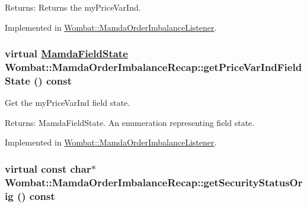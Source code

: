\begin{Desc}
\item[Returns:]Returns the my\-Price\-Var\-Ind. \end{Desc}


Implemented in \hyperlink{classWombat_1_1MamdaOrderImbalanceListener_dcb92d290caa24fbf12d5521f5917fe4}{Wombat::Mamda\-Order\-Imbalance\-Listener}.\hypertarget{classWombat_1_1MamdaOrderImbalanceRecap_00676cadceeeccb79a6e27f2001580ca}{
\subsubsection[getPriceVarIndFieldState]{\setlength{\rightskip}{0pt plus 5cm}virtual \hyperlink{namespaceWombat_93aac974f2ab713554fd12a1fa3b7d2a}{Mamda\-Field\-State} Wombat::Mamda\-Order\-Imbalance\-Recap::get\-Price\-Var\-Ind\-Field\-State () const}}
\label{classWombat_1_1MamdaOrderImbalanceRecap_00676cadceeeccb79a6e27f2001580ca}


Get the my\-Price\-Var\-Ind field state. 

\begin{Desc}
\item[Returns:]Mamda\-Field\-State. An enumeration representing field state. \end{Desc}


Implemented in \hyperlink{classWombat_1_1MamdaOrderImbalanceListener_b59ba04652f3f591eab16bd569caa711}{Wombat::Mamda\-Order\-Imbalance\-Listener}.\hypertarget{classWombat_1_1MamdaOrderImbalanceRecap_50880a888721be863d184627c984125b}{
\subsubsection[getSecurityStatusOrig]{\setlength{\rightskip}{0pt plus 5cm}virtual const char$\ast$ Wombat::Mamda\-Order\-Imbalance\-Recap::get\-Security\-Status\-Orig () const}}
\label{classWombat_1_1MamdaOrderImbalanceRecap_50880a888721be863d184627c984125b}


